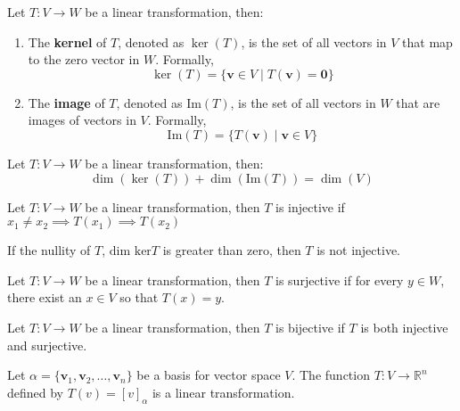 \documentclass[11pt]{report}
\begin{document}
\begin{definition}
    Let $T: V \rightarrow W$ be a linear transformation, then: 
    \begin{enumerate}
        \item The \textbf{kernel} of $T$, denoted as $\ker(T)$, is the set of all vectors in $V$ that map to the zero vector in $W$. Formally,
        \[
        \ker(T) = \{ \textbf{v} \in V \mid T(\textbf{v}) = \textbf{0} \}
        \]
        \item The \textbf{image} of $T$, denoted as $\text{Im}(T)$, is the set of all vectors in $W$ that are images of vectors in $V$. Formally,
        \[
        \text{Im}(T) = \{ T(\textbf{v}) \mid \textbf{v} \in V \}
        \]
    \end{enumerate}
\end{definition}
\begin{theorem}
    Let $T: V \rightarrow W$ be a linear transformation, then:
    \begin{equation}
        \dim(\ker(T)) + \dim(\text{Im}(T)) = \dim(V)
    \end{equation}
\end{theorem}
\begin{definition}[Injective LT]
    Let $T: V \rightarrow W$ be a linear transformation, then $T$ is injective if $x_1 \neq x_2 \implies T(x_1) \implies T(x_2)$
\end{definition}
\begin{theorem}
    If the nullity of $T$, $\text{dim ker} T$ is greater than zero, then $T$ is not injective.
\end{theorem}
\begin{definition}[Surjective]
    Let $T: V \rightarrow W$ be a linear transformation, then $T$ is surjective if for every $y \in W$, there exist an $x \in V$ so that $T(x) = y$.
\end{definition}
\begin{definition}[Bijective]
    Let $T: V \rightarrow W$ be a linear transformation, then $T$ is bijective if $T$ is both injective and surjective.
\end{definition}
\begin{theorem}
    Let $\alpha = \{\textbf{v}_1, \textbf{v}_2, \ldots, \textbf{v}_n\}$ be a basis for vector space $V$. The function $T: V \to \mathbb{R}^n$ defined by $T(v) = [v]_\alpha$ is a linear transformation.
\end{theorem}
\end{document}
